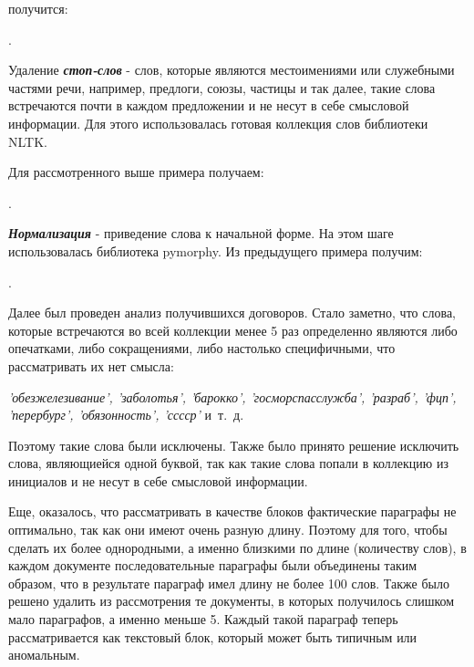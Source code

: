 \documentclass[12pt]{article}
\begin{document}
\vspace{13pt}
\noindent получится:

\vspace{13pt}
.

 \vspace{13pt}

Удаление \textbf{\textit{стоп-слов}} - слов, которые являются местоимениями или служебными частями речи, например, предлоги, союзы, частицы и так далее, такие слова встречаются почти в каждом предложении и не несут в себе смысловой информации. Для этого использовалась готовая коллекция слов библиотеки NLTK. 

Для рассмотренного выше примера получаем:

\vspace{13pt}
.
\vspace{13pt}

\textbf{\textit{Нормализация}} - приведение слова к начальной форме. На этом шаге использовалась библиотека pymorphy. Из предыдущего примера получим:

\vspace{13pt}
.
\vspace{13pt}

Далее был проведен анализ получившихся договоров. Стало заметно, что слова, которые встречаются во всей коллекции менее 5 раз определенно являются либо опечатками, либо сокращениями, либо настолько специфичными, что рассматривать их нет смысла: 

\vspace{10pt}
\noindent\textit{'обезжелезивание', 'заболотья', 'барокко', 'госморспасслужба', \linebreak 'разраб', 'фцп', 'перербург', 'обязонность', 'сссср'} и~т.~д.
\vspace{10pt}

Поэтому такие слова были исключены. Также было принято решение исключить слова, являющиейся одной буквой, так как такие слова попали в коллекцию из инициалов и не несут в себе смысловой информации.

Еще, оказалось, что рассматривать в качестве блоков фактические параграфы не оптимально, так как они имеют очень разную длину. Поэтому для того, чтобы сделать их более однородными, а именно близкими по длине (количеству слов), в каждом документе последовательные параграфы были объединены таким образом, что в результате параграф имел длину не более 100 слов. Также было решено удалить из рассмотрения те документы, в которых получилось слишком мало параграфов, а именно меньше 5. Каждый такой параграф теперь рассматривается как текстовый блок, который может быть типичным или аномальным. 
\end{document}
